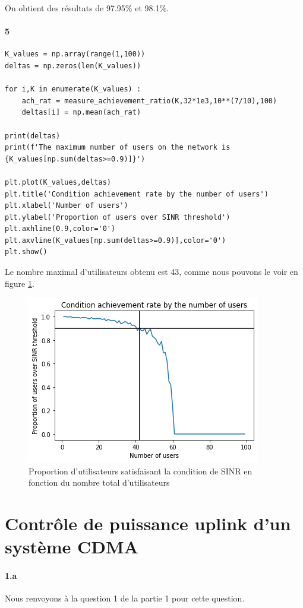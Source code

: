 \documentclass[a4paper,11pt,2]{article}
\begin{document}
On obtient des résultats de 97.95\% et 98.1\%.

\paragraph{5}
\begin{center}
\begin{lstlisting}
K_values = np.array(range(1,100))
deltas = np.zeros(len(K_values))

for i,K in enumerate(K_values) :
    ach_rat = measure_achievement_ratio(K,32*1e3,10**(7/10),100)
    deltas[i] = np.mean(ach_rat)

print(deltas)
print(f'The maximum number of users on the network is {K_values[np.sum(deltas>=0.9)]}')

plt.plot(K_values,deltas)
plt.title('Condition achievement rate by the number of users')
plt.xlabel('Number of users')
plt.ylabel('Proportion of users over SINR threshold')
plt.axhline(0.9,color='0')
plt.axvline(K_values[np.sum(deltas>=0.9)],color='0')
plt.show()
\end{lstlisting}
\end{center}
Le nombre maximal d'utilisateurs obtenu est 43, comme nous pouvons le voir en figure \ref{fig:I5}.

\begin{figure}[h]
\centering
\includegraphics[width=0.7\linewidth]{./Images/I-5.png}
\caption{Proportion d'utilisateurs satisfaisant la condition de SINR en fonction du nombre total d'utilisateurs}
\label{fig:I5}
\end{figure}

\section{Contrôle de puissance uplink d'un système CDMA}
\paragraph{1.a} Nous renvoyons à la question 1 de la partie 1 pour cette question.
\end{document}
